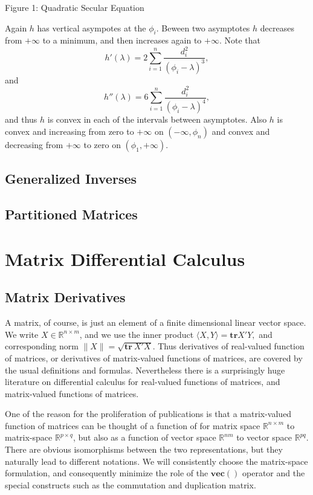 \documentclass[
  12pt,
]{book}
\begin{document}
Figure 1: Quadratic Secular Equation

Again \(h\) has vertical asympotes at the \(\phi_i\). Beween two asymptotes \(h\) decreases from \(+\infty\) to a minimum, and then increases again to \(+\infty\). Note that
\[
h'(\lambda)=2\sum_{i=1}^n\frac{d_i^2}{(\phi_i-\lambda)^3},
\]
and
\[
h''(\lambda)=6\sum_{i=1}^n\frac{d_i^2}{(\phi_i-\lambda)^4},
\]
and thus \(h\) is convex in each of the intervals between asymptotes. Also \(h\) is convex and increasing from zero to \(+\infty\)
on \((-\infty,\phi_n)\) and convex and decreasing from \(+\infty\) to zero on \((\phi_1,+\infty)\).

\hypertarget{generalized-inverses}{%
\subsection{Generalized Inverses}\label{generalized-inverses}}

\hypertarget{partitioned-matrices}{%
\subsection{Partitioned Matrices}\label{partitioned-matrices}}

\hypertarget{matrix-differential-calculus}{%
\section{Matrix Differential Calculus}\label{matrix-differential-calculus}}

\hypertarget{matrix-derivatives}{%
\subsection{Matrix Derivatives}\label{matrix-derivatives}}

A matrix, of course, is just an element of a finite dimensional linear vector space. We write \(X\in\mathbb{R}^{n\times m}\), and we use the
inner product \(\langle X,Y\rangle=\mathbf{tr} X'Y,\) and corresponding norm \(\|X\|=\sqrt{\mathbf{tr}\ X'X}.\) Thus derivatives of real-valued function of matrices, or derivatives of matrix-valued functions of matrices, are covered by the usual definitions and formulas. Nevertheless
there is a surprisingly huge literature on differential calculus for real-valued functions of matrices, and matrix-valued functions of matrices.

One of the reason for the proliferation of publications is that a matrix-valued function of matrices can be thought of a function of
for matrix space \(\mathbb{R}^{n\times m}\) to matrix-space \(\mathbb{R}^{p\times q}\), but also as a function of vector space \(\mathbb{R}^{nm}\) to vector space \(\mathbb{R}^{pq}\). There are obvious isomorphisms between the two representations, but
they naturally lead to different notations. We will consistently choose the matrix-space formulation, and consequently minimize the role of the \(\mathbf{vec}()\) operator and the special constructs such as the commutation and duplication matrix.
\end{document}
